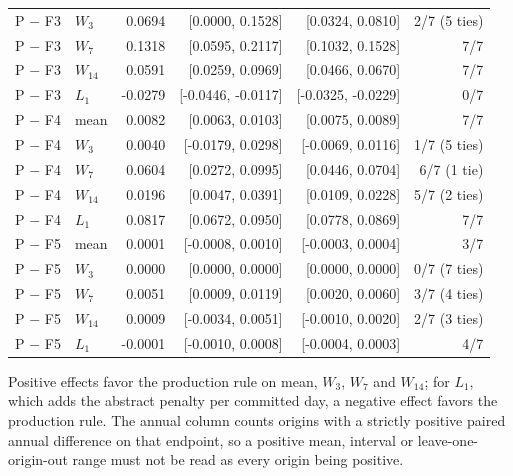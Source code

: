 {\begin{longtable}{@{}llrrrr@{}}
P $-$ F3 & $W_3$ & 0.0694 & [0.0000, 0.1528] & [0.0324, 0.0810] & 2/7 (5 ties) \\
P $-$ F3 & $W_7$ & 0.1318 & [0.0595, 0.2117] & [0.1032, 0.1528] & 7/7 \\
P $-$ F3 & $W_{14}$ & 0.0591 & [0.0259, 0.0969] & [0.0466, 0.0670] & 7/7 \\
P $-$ F3 & $L_1$ & -0.0279 & [-0.0446, -0.0117] & [-0.0325, -0.0229] & 0/7 \\
P $-$ F4 & mean & 0.0082 & [0.0063, 0.0103] & [0.0075, 0.0089] & 7/7 \\
P $-$ F4 & $W_3$ & 0.0040 & [-0.0179, 0.0298] & [-0.0069, 0.0116] & 1/7 (5 ties) \\
P $-$ F4 & $W_7$ & 0.0604 & [0.0272, 0.0995] & [0.0446, 0.0704] & 6/7 (1 tie) \\
P $-$ F4 & $W_{14}$ & 0.0196 & [0.0047, 0.0391] & [0.0109, 0.0228] & 5/7 (2 ties) \\
P $-$ F4 & $L_1$ & 0.0817 & [0.0672, 0.0950] & [0.0778, 0.0869] & 7/7 \\
P $-$ F5 & mean & 0.0001 & [-0.0008, 0.0010] & [-0.0003, 0.0004] & 3/7 \\
P $-$ F5 & $W_3$ & 0.0000 & [0.0000, 0.0000] & [0.0000, 0.0000] & 0/7 (7 ties) \\
P $-$ F5 & $W_7$ & 0.0051 & [0.0009, 0.0119] & [0.0020, 0.0060] & 3/7 (4 ties) \\
P $-$ F5 & $W_{14}$ & 0.0009 & [-0.0034, 0.0051] & [-0.0010, 0.0020] & 2/7 (3 ties) \\
P $-$ F5 & $L_1$ & -0.0001 & [-0.0010, 0.0008] & [-0.0004, 0.0003] & 4/7 \\
\end{longtable}
}
\par\footnotesize Positive effects favor the production rule on mean, $W_3$, $W_7$ and $W_{14}$; for $L_1$, which adds the abstract penalty per committed day, a negative effect favors the production rule. The annual column counts origins with a strictly positive paired annual difference on that endpoint, so a positive mean, interval or leave-one-origin-out range must not be read as every origin being positive.
